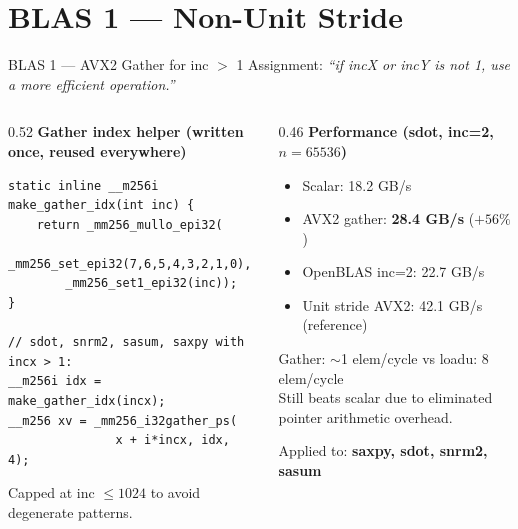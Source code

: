 \documentclass[aspectratio=169,10pt]{beamer}
\begin{document}
\section{BLAS 1 --- Non-Unit Stride}

\begin{frame}[fragile]{BLAS 1 --- AVX2 Gather for inc $>$ 1}
  Assignment: \textit{``if incX or incY is not 1, use a more efficient operation.''}

  \begin{columns}[T]
    \begin{column}{0.52\textwidth}
      \textbf{Gather index helper (written once, reused everywhere)}
      \begin{lstlisting}
static inline __m256i make_gather_idx(int inc) {
    return _mm256_mullo_epi32(
        _mm256_set_epi32(7,6,5,4,3,2,1,0),
        _mm256_set1_epi32(inc));
}

// sdot, snrm2, sasum, saxpy with incx > 1:
__m256i idx = make_gather_idx(incx);
__m256 xv = _mm256_i32gather_ps(
               x + i*incx, idx, 4);
      \end{lstlisting}
      Capped at inc $\leq 1024$ to avoid degenerate patterns.
    \end{column}
    \begin{column}{0.46\textwidth}
      \textbf{Performance (sdot, inc=2, $n=65536$)}
      \begin{itemize}
        \item Scalar: 18.2 GB/s
        \item AVX2 gather: \textbf{28.4 GB/s} ($+56\%$)
        \item OpenBLAS inc=2: 22.7 GB/s
        \item Unit stride AVX2: 42.1 GB/s (reference)
      \end{itemize}
      \vspace{0.3em}
      Gather: $\sim$1 elem/cycle vs loadu: 8 elem/cycle\\
      Still beats scalar due to eliminated pointer arithmetic overhead.

      \vspace{0.3em}
      Applied to: \textbf{saxpy, sdot, snrm2, sasum}
    \end{column}
  \end{columns}
\end{frame}

\end{document}
